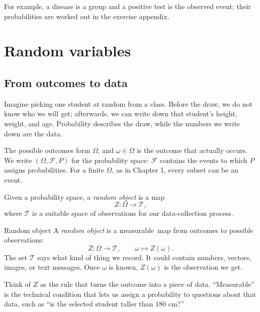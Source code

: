 \documentclass[a4paper,12pt,oneside]{report}
\begin{document}
For example, a disease is a group
and a positive test is the observed event; their probabilities
are worked out in the exercise appendix.

\chapter{Random variables}


\section{From outcomes to data}

Imagine picking one student at random from a class. Before the draw, we do
not know who we will get; afterwards, we can write down that student's
height, weight, and age. Probability describes the draw, while the numbers
we write down are the data.

The possible outcomes form $\Omega$, and $\omega\in\Omega$ is the outcome
that actually occurs. We write $(\Omega,\mathcal F,P)$ for the probability
space: $\mathcal F$ contains the events to which $P$ assigns probabilities.
For a finite $\Omega$, as in Chapter 1, every subset can be an event.

\begin{tcolorbox}[definitionbox,title={Definition (informal): Random object}]
Given a probability space, a \emph{random object} is a map
\[
  Z:\Omega\longrightarrow\mathcal T,
\]
where $\mathcal T$ is a suitable space of observations for our
data-collection process.
\end{tcolorbox}

\begingroup
\renewcommand{\thefootnote}{\fnsymbol{footnote}}
\endgroup

\begin{frameddefn}{Random object}\label{def:random-object}
A \emph{random object} is a measurable\begingroup\renewcommand{\thefootnote}{\fnsymbol{footnote}}\footnotemark[1]\endgroup\ map from outcomes to possible
observations:
\[
  Z:\Omega\longrightarrow\mathcal T,
  \qquad \omega\longmapsto Z(\omega).
\]
The set $\mathcal T$ says what kind of thing we record. It could contain
numbers, vectors, images, or text messages. Once $\omega$ is known,
$Z(\omega)$ is the observation we get.
\end{frameddefn}

Think of $Z$ as the rule that turns the outcome into a piece of data.
``Measurable'' is the technical condition that lets us assign a probability
to questions about that data, such as ``is the selected student taller
than $180$ cm?''
\end{document}
